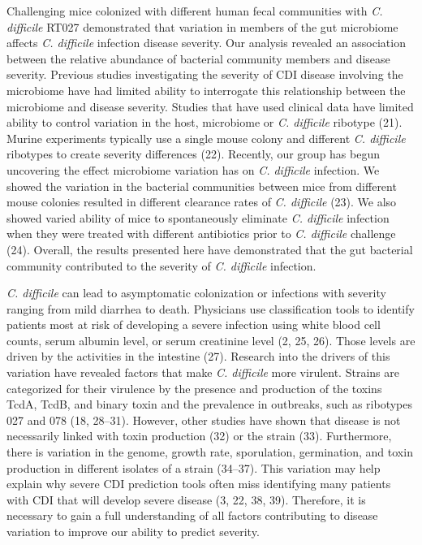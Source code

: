 \documentclass[
  12pt,
]{article}
\begin{document}
Challenging mice colonized with different human fecal communities with
\emph{C. difficile} RT027 demonstrated that variation in members of the
gut microbiome affects \emph{C. difficile} infection disease severity.
Our analysis revealed an association between the relative abundance of
bacterial community members and disease severity. Previous studies
investigating the severity of CDI disease involving the microbiome have
had limited ability to interrogate this relationship between the
microbiome and disease severity. Studies that have used clinical data
have limited ability to control variation in the host, microbiome or
\emph{C. difficile} ribotype (21). Murine experiments typically use a
single mouse colony and different \emph{C. difficile} ribotypes to
create severity differences (22). Recently, our group has begun
uncovering the effect microbiome variation has on \emph{C. difficile}
infection. We showed the variation in the bacterial communities between
mice from different mouse colonies resulted in different clearance rates
of \emph{C. difficile} (23). We also showed varied ability of mice to
spontaneously eliminate \emph{C. difficile} infection when they were
treated with different antibiotics prior to \emph{C. difficile}
challenge (24). Overall, the results presented here have demonstrated
that the gut bacterial community contributed to the severity of \emph{C.
difficile} infection.

\emph{C. difficile} can lead to asymptomatic colonization or infections
with severity ranging from mild diarrhea to death. Physicians use
classification tools to identify patients most at risk of developing a
severe infection using white blood cell counts, serum albumin level, or
serum creatinine level (2, 25, 26). Those levels are driven by the
activities in the intestine (27). Research into the drivers of this
variation have revealed factors that make \emph{C. difficile} more
virulent. Strains are categorized for their virulence by the presence
and production of the toxins TcdA, TcdB, and binary toxin and the
prevalence in outbreaks, such as ribotypes 027 and 078 (18, 28--31).
However, other studies have shown that disease is not necessarily linked
with toxin production (32) or the strain (33). Furthermore, there is
variation in the genome, growth rate, sporulation, germination, and
toxin production in different isolates of a strain (34--37). This
variation may help explain why severe CDI prediction tools often miss
identifying many patients with CDI that will develop severe disease (3,
22, 38, 39). Therefore, it is necessary to gain a full understanding of
all factors contributing to disease variation to improve our ability to
predict severity.
\end{document}
